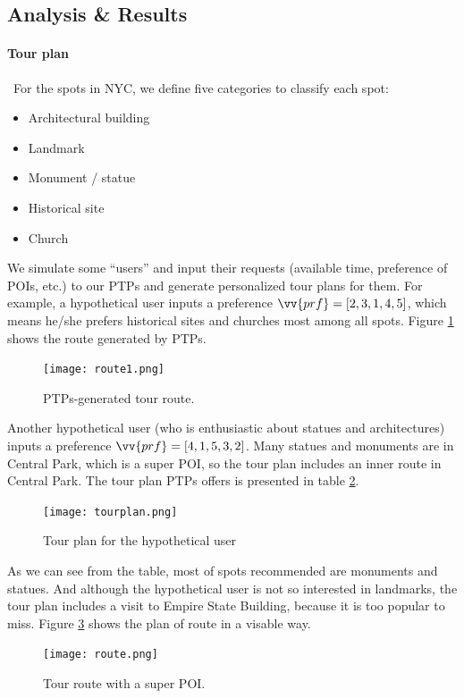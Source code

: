 \documentclass{mcmthesis}
\begin{document}
\subsection{Analysis \& Results}
  \paragraph{Tour plan} \
  For the spots in NYC, we define five categories to classify each spot: \par
  \begin{itemize}
    \item Architectural building
    \item Landmark
    \item Monument / statue
    \item Historical site
    \item Church
  \end{itemize}
  We simulate some ``users'' and input their requests (available time, preference of POIs, etc.) to our PTPs and generate personalized tour plans for them. For example, a hypothetical user inputs a preference $\vv{prf} = [2,3,1,4,5]$, which means he/she prefers historical sites and churches most among all spots. Figure \ref{fig:route1} shows the route generated by PTPs.\par
  \begin{figure}[h]
    \centering
    \texttt{[image: route1.png]}
    \caption{PTPs-generated tour route.}
    \label{fig:route1}
  \end{figure}
  Another hypothetical user (who is enthusiastic about statues and architectures) inputs a preference $\vv{prf} = [4, 1, 5, 3, 2]$. Many statues and monuments are in Central Park, which is a super POI, so the tour plan includes an inner route in Central Park. The tour plan PTPs offers is presented in table \ref{fig:table}.
  \begin{figure}[h]
    \centering
    \texttt{[image: tourplan.png]}
    \caption{Tour plan for the hypothetical user}
    \label{fig:table}
  \end{figure}
  As we can see from the table, most of spots recommended are monuments and statues. And although the hypothetical user is not so interested in landmarks, the tour plan includes a visit to Empire State Building, because it is too popular to miss. Figure \ref{fig:route} shows the plan of route in a visable way.
  \begin{figure}[h]
    \centering
    \texttt{[image: route.png]}
    \caption{Tour route with a super POI.}
    \label{fig:route}
  \end{figure}
\end{document}
